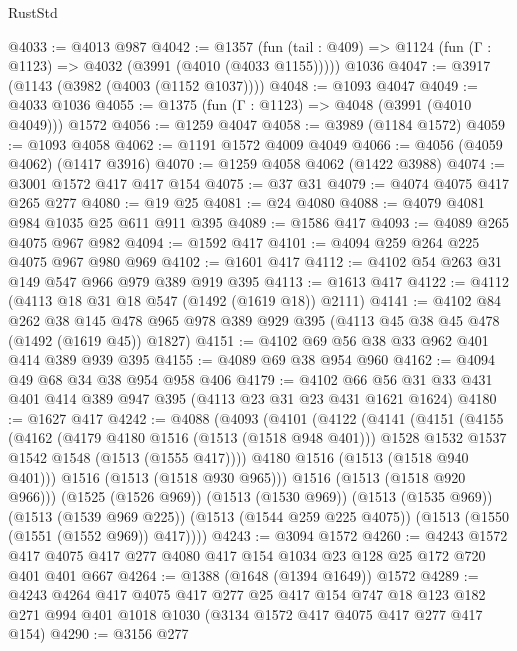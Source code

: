 \begin{lexlean}{RustStd}
\begin{coremodule}
@4033 := @4013 @987
@4042 := @1357
    (fun (tail : @409) => @1124 (fun (Γ : @1123) => @4032 (@3991 (@4010 (@4033 @1155)))))
    @1036
@4047 := @3917 (@1143 (@3982 (@4003 (@1152 @1037))))
@4048 := @1093 @4047
@4049 := @4033 @1036
@4055 := @1375 (fun (Γ : @1123) => @4048 (@3991 (@4010 @4049))) @1572
@4056 := @1259 @4047
@4058 := @3989 (@1184 @1572)
@4059 := @1093 @4058
@4062 := @1191 @1572 @4009 @4049
@4066 := @4056 (@4059 @4062) (@1417 @3916)
@4070 := @1259 @4058 @4062 (@1422 @3988)
@4074 := @3001 @1572 @417 @417 @154
@4075 := @37 @31
@4079 := @4074 @4075 @417 @265 @277
@4080 := @19 @25
@4081 := @24 @4080
@4088 := @4079 @4081 @984 @1035 @25 @611 @911 @395
@4089 := @1586 @417
@4093 := @4089 @265 @4075 @967 @982
@4094 := @1592 @417
@4101 := @4094 @259 @264 @225 @4075 @967 @980 @969
@4102 := @1601 @417
@4112 := @4102 @54 @263 @31 @149 @547 @966 @979 @389 @919 @395
@4113 := @1613 @417
@4122 := @4112 (@4113 @18 @31 @18 @547 (@1492 (@1619 @18)) @2111)
@4141 := @4102
    @84
    @262
    @38
    @145
    @478
    @965
    @978
    @389
    @929
    @395
    (@4113 @45 @38 @45 @478 (@1492 (@1619 @45)) @1827)
@4151 := @4102 @69 @56 @38 @33 @962 @401 @414 @389 @939 @395
@4155 := @4089 @69 @38 @954 @960
@4162 := @4094 @49 @68 @34 @38 @954 @958 @406
@4179 := @4102 @66 @56 @31 @33 @431 @401 @414 @389 @947 @395 (@4113 @23 @31 @23 @431 @1621 @1624)
@4180 := @1627 @417
@4242 := @4088
    (@4093
      (@4101
        (@4122
          (@4141
            (@4151
              (@4155
                (@4162
                  (@4179 @4180 @1516 (@1513 (@1518 @948 @401)))
                  @1528
                  @1532
                  @1537
                  @1542
                  @1548
                  (@1513 (@1555 @417))))
              @4180
              @1516
              (@1513 (@1518 @940 @401)))
            @1516
            (@1513 (@1518 @930 @965)))
          @1516
          (@1513 (@1518 @920 @966)))
        (@1525 (@1526 @969))
        (@1513 (@1530 @969))
        (@1513 (@1535 @969))
        (@1513 (@1539 @969 @225))
        (@1513 (@1544 @259 @225 @4075))
        (@1513 (@1550 (@1551 (@1552 @969)) @417))))
@4243 := @3094 @1572
@4260 := @4243
    @1572
    @417
    @4075
    @417
    @277
    @4080
    @417
    @154
    @1034
    @23
    @128
    @25
    @172
    @720
    @401
    @401
    @667
@4264 := @1388 (@1648 (@1394 @1649)) @1572
@4289 := @4243
    @4264
    @417
    @4075
    @417
    @277
    @25
    @417
    @154
    @747
    @18
    @123
    @182
    @271
    @994
    @401
    @1018
    @1030
    (@3134 @1572 @417 @4075 @417 @277 @417 @154)
@4290 := @3156 @277

\end{coremodule}
\end{lexlean}
